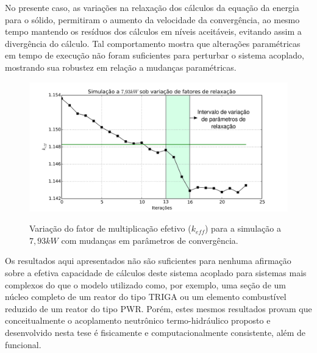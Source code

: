 No presente caso, as variações na relaxação dos cálculos da equação da energia para
o sólido, permitiram o aumento da velocidade da convergência, ao mesmo tempo mantendo
os resíduos dos cálculos em níveis aceitáveis, evitando assim a divergência do cálculo.
Tal comportamento mostra que alterações paramétricas em tempo de execução não foram
suficientes para perturbar o sistema acoplado, mostrando sua robustez em relação
a mudanças paramétricas.

\begin{figure}[htb]
  \caption[Variação do fator de multiplicação sobe variação de parâmetros de convergência.]{Variação do fator de multiplicação efetivo ($k_{eff}$) para a simulação a $7,93 kW$ com mudanças em parâmetros de convergência.}
  \centering\includegraphics[scale=0.5]{figuras/plot200-disturb-port.png}
  \label{fig:keff_dist}
\end{figure}


Os resultados aqui apresentados não são suficientes para nenhuma afirmação sobre a
efetiva capacidade de cálculos deste sistema acoplado para sistemas mais complexos
do que o modelo utilizado como, por exemplo, uma seção de um núcleo completo de um
reator do tipo TRIGA ou um elemento combustível reduzido de um reator do tipo PWR.
Porém, estes mesmos resultados provam que conceitualmente o acoplamento neutrônico
termo-hidráulico proposto e desenvolvido nesta tese é fisicamente e computacionalmente
consistente, além de funcional.

